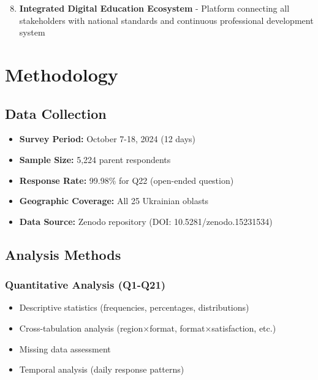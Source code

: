 \documentclass[11pt,a4paper]{article}
\begin{document}
\begin{enumerate}
\setcounter{enumi}{7}
    \item \textbf{Integrated Digital Education Ecosystem} - Platform connecting all stakeholders with national standards and continuous professional development system
\end{enumerate}

\newpage

\section{Methodology}

\subsection{Data Collection}

\begin{itemize}
    \item \textbf{Survey Period:} October 7-18, 2024 (12 days)
    \item \textbf{Sample Size:} 5,224 parent respondents
    \item \textbf{Response Rate:} 99.98\% for Q22 (open-ended question)
    \item \textbf{Geographic Coverage:} All 25 Ukrainian oblasts
    \item \textbf{Data Source:} Zenodo repository (DOI: 10.5281/zenodo.15231534)
\end{itemize}

\subsection{Analysis Methods}

\subsubsection{Quantitative Analysis (Q1-Q21)}
\begin{itemize}
    \item Descriptive statistics (frequencies, percentages, distributions)
    \item Cross-tabulation analysis (region×format, format×satisfaction, etc.)
    \item Missing data assessment
    \item Temporal analysis (daily response patterns)
\end{itemize}
\end{document}
